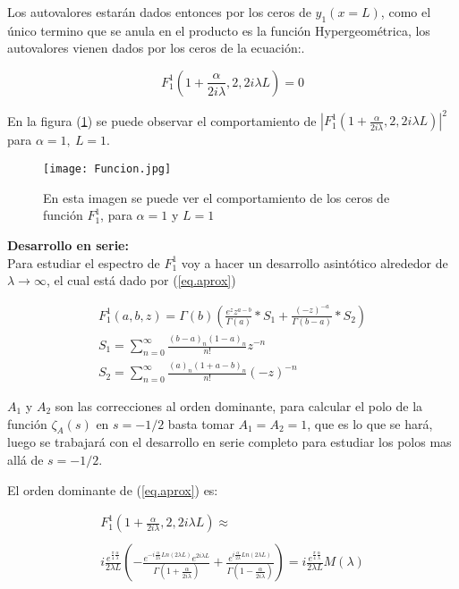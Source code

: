 Los autovalores estarán dados entonces por los ceros de $y_1 (x= L)$, como el único termino que se anula en el producto es la función Hypergeométrica, los autovalores vienen dados por los ceros de la ecuación:.


\begin{equation}
F _1 ^1 (1+\frac{ \alpha}{2 i \lambda},2,2 i \lambda L)  = 0
\label{eq.1}
\end{equation}

En la figura (\ref{fig:funcion}) se puede observar el comportamiento  de $ | F _1 ^1 (1+\frac{ \alpha}{2 i \lambda},2,2 i \lambda L) | ^2 $ para   $\alpha=1, \ L=1$. \\

\begin{figure}[h!]
\centering
\texttt{[image: Funcion.jpg]}
\caption{En esta imagen se puede ver el comportamiento de los ceros de función $F _1 ^1$, para $\alpha=1$ y $L=1$}
\label{fig:funcion}
\end{figure}

\textbf{Desarrollo en serie:} \\

Para estudiar el espectro de $F _1 ^1$ voy a hacer un desarrollo asintótico alrededor de $\lambda \rightarrow \infty$, el cual está dado por (\ref{eq.aprox})


\begin{equation}
\begin{array}{c}
    F _1 ^1 (a,b,z) = \Gamma (b) 
    \left(
    \frac{e^z z ^{a-b} }{\Gamma(a)} * S_1 + \frac{(-z) ^{ -a}}{ \Gamma(b-a)} 
    * S_2
    \right) \\ 
    S _1 = \sum _{n=0} ^{\infty} \frac{(b-a) _n (1-a) _n}{n!} z ^{-n} \\ 
    S _2 = \sum _{n=0} ^{\infty} \frac{(a) _n (1+a-b) _n}{n!} (-z) ^{-n}
    
\end{array}
\label{eq.aprox}
\end{equation}

$A_1$ y $A _2$ son las correcciones al orden dominante, para calcular el polo de la función $\zeta _A (s)$ en $s=-1/2$ basta tomar $A _1 = A _2 = 1$, que es lo que se hará, luego se trabajará con el desarrollo en serie completo para estudiar los polos mas allá de $s=-1/2$. 



El orden dominante de (\ref{eq.aprox}) es:

\begin{equation}
\begin{array}{c}
    F _1 ^1 (1+  \frac{  \alpha}{2 i \lambda} ,2 ,2 i \lambda L  ) \approx \\ \\
   i  \frac{e ^{ \frac{\pi}{4} \frac{\alpha}{\lambda} } }{2 \lambda L}
    \left( -
    \frac{e ^{- i \frac{\alpha}{2 \lambda} Ln(2 \lambda L) } e ^{2 i \lambda L} }{\Gamma(1+\frac{ \alpha}{2 i \lambda})} +
    \frac{e ^{  i \frac{\alpha}{2 \lambda} Ln(2 \lambda L) }}               {\Gamma(1-\frac{ \alpha}{2 i \lambda})}
    \right) = 
    i  \frac{e ^{ \frac{\pi}{4} \frac{\alpha}{\lambda} } }{2 \lambda L}     M (\lambda) 
\end{array}
\label{eq.completa}
\end{equation}

